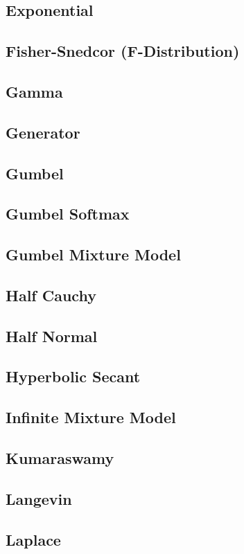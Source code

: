 \subsection{Exponential}
\subsection{Fisher-Snedcor (F-Distribution)}
\subsection{Gamma}
\subsection{Generator}
\subsection{Gumbel}
\subsection{Gumbel Softmax}
\subsection{Gumbel Mixture Model}
\subsection{Half Cauchy}
\subsection{Half Normal}
\subsection{Hyperbolic Secant}
\subsection{Infinite Mixture Model}
\subsection{Kumaraswamy}
\subsection{Langevin}
\subsection{Laplace}
